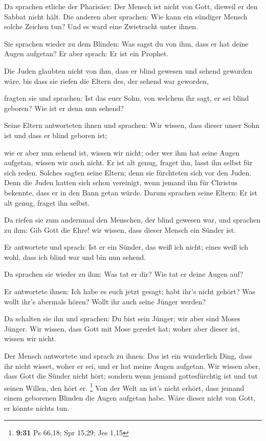  Da sprachen etliche der Pharisäer: Der Mensch ist nicht
von Gott, dieweil er den Sabbat nicht hält. Die anderen aber sprachen:
Wie kann ein sündiger Mensch solche Zeichen tun? Und es ward eine
Zwietracht unter ihnen.

 Sie sprachen wieder zu dem Blinden: Was sagst du von ihm,
dass er hat deine Augen aufgetan? Er aber sprach: Er ist ein Prophet.

 Die Juden glaubten nicht von ihm, dass er blind gewesen
und sehend geworden wäre, bis dass sie riefen die Eltern des, der sehend
war geworden,

 fragten sie und sprachen: Ist das euer Sohn, von welchem
ihr sagt, er sei blind geboren? Wie ist er denn nun sehend?

 Seine Eltern antworteten ihnen und sprachen: Wir wissen,
dass dieser unser Sohn ist und dass er blind geboren ist;

 wie er aber nun sehend ist, wissen wir nicht; oder wer ihm
hat seine Augen aufgetan, wissen wir auch nicht. Er ist alt genug,
fraget ihn, lasst ihn selbst für sich reden.  Solches
sagten seine Eltern; denn sie fürchteten sich vor den Juden. Denn die
Juden hatten sich schon vereinigt, wenn jemand ihn für Christus
bekennte, dass er in den Bann getan würde.  Darum sprachen
seine Eltern: Er ist alt genug, fraget ihn selbst.

 Da riefen sie zum andernmal den Menschen, der blind
gewesen war, und sprachen zu ihm: Gib Gott die Ehre! wir wissen, dass
dieser Mensch ein Sünder ist.

 Er antwortete und sprach: Ist er ein Sünder, das weiß ich
nicht; eines weiß ich wohl, dass ich blind war und bin nun sehend.

 Da sprachen sie wieder zu ihm: Was tat er dir? Wie tat er
deine Augen auf?

 Er antwortete ihnen: Ich habe es euch jetzt gesagt; habt
ihr's nicht gehört? Was wollt ihr's abermals hören? Wollt ihr auch seine
Jünger werden?

 Da schalten sie ihn und sprachen: Du bist sein Jünger; wir
aber sind Moses Jünger.  Wir wissen, dass Gott mit Mose
geredet hat; woher aber dieser ist, wissen wir nicht.

 Der Mensch antwortete und sprach zu ihnen: Das ist ein
wunderlich Ding, dass ihr nicht wisset, woher er sei, und er hat meine
Augen aufgetan.  Wir wissen aber, dass Gott die Sünder
nicht hört; sondern wenn jemand gottesfürchtig ist und tut seinen
Willen, den hört er. \footnote{\textbf{9:31} Ps 66,18; Spr 15,29; Jes
  1,15}  Von der Welt an ist's nicht erhört, dass jemand
einem geborenen Blinden die Augen aufgetan habe.  Wäre
dieser nicht von Gott, er könnte nichts tun.

